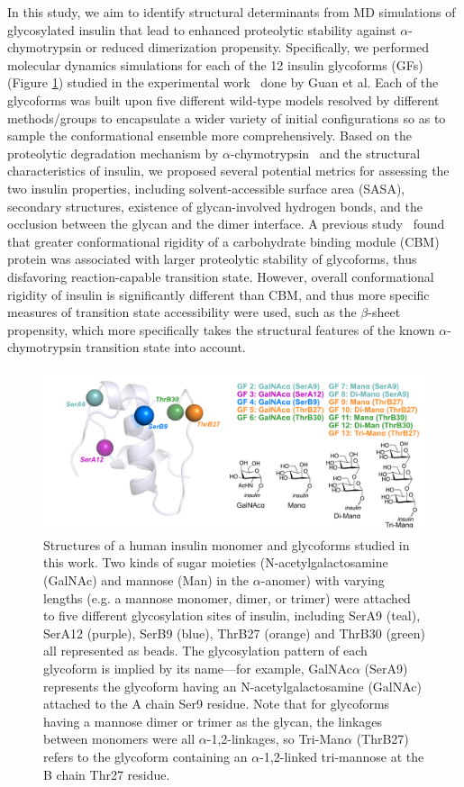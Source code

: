 \documentclass[9pt]{elife}
\begin{document}
In this study, we aim to identify structural determinants from MD simulations of glycosylated insulin that lead to enhanced proteolytic stability against $\alpha$-chymotrypsin or reduced dimerization propensity. Specifically, we performed molecular dynamics simulations for each of the 12 insulin glycoforms (GFs) (Figure \ref{sys_of_interest}) studied in the experimental work~\cite{guan2018chemically} done by Guan et al. Each of the glycoforms was built upon five different wild-type models resolved by different methods/groups to encapsulate a wider variety of initial configurations so as to sample the conformational ensemble more comprehensively. Based on the proteolytic degradation mechanism by $\alpha$-chymotrypsin~\cite{schilling1991degradation} and the structural characteristics of insulin, we proposed several potential metrics for assessing the two insulin properties, including solvent-accessible surface area (SASA), secondary structures, existence of glycan-involved hydrogen bonds, and the occlusion between the glycan and the dimer interface. A previous study~\cite{chaffey2017structural} found that greater conformational rigidity of a carbohydrate binding module (CBM) protein was  associated with larger proteolytic stability of glycoforms, thus disfavoring  reaction-capable transition state. However, overall conformational rigidity of insulin is significantly different than CBM, and thus more specific measures of transition state accessibility were used, such as the $\beta$-sheet propensity, which more specifically takes the structural features of the known $\alpha$-chymotrypsin transition state into account.
\begin{figure}[H]
\centering
\includegraphics[width=\textwidth]{Figures/Fig_glycan_positions.png}
\caption{Structures of a human insulin monomer and glycoforms studied in this work. Two kinds of sugar moieties (N-acetylgalactosamine (GalNAc) and mannose (Man) in the $\alpha$-anomer) with varying lengths (e.g. a mannose monomer, dimer, or trimer) were attached to five different glycosylation sites of insulin, including SerA9 (teal), SerA12 (purple), SerB9 (blue), ThrB27 (orange) and ThrB30 (green) all represented as beads. The glycosylation pattern of each glycoform is implied by its name---for example, GalNAc$\alpha$ (SerA9) represents the glycoform having an N-acetylgalactosamine (GalNAc) attached to the A chain Ser9 residue. Note that for glycoforms having a mannose dimer or trimer as the glycan, the linkages between monomers were all $\alpha$-1,2-linkages, so Tri-Man$\alpha$ (ThrB27) refers to the glycoform containing an $\alpha$-1,2-linked tri-mannose at the B chain Thr27 residue.}
\label{sys_of_interest}
\end{figure}
\end{document}
